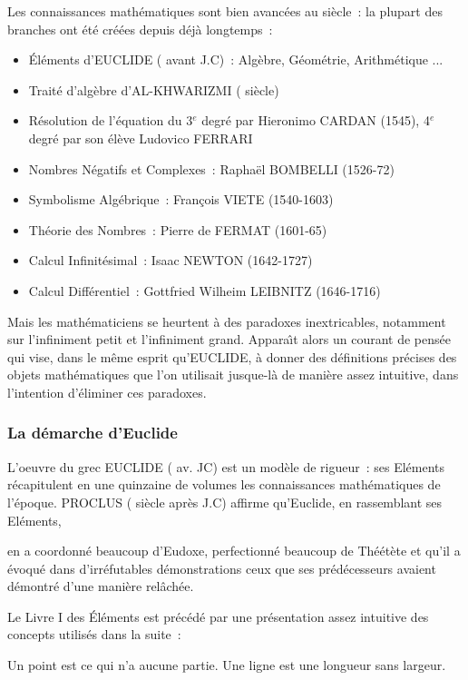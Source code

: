 Les connaissances mathématiques sont bien avancées au  siècle~: la
plupart des branches ont été créées depuis déjà longtemps~:

\begin{itemize}
\item Éléments d'EUCLIDE ( avant J.C)~: Algèbre, Géométrie,
  Arithmétique ...
\item Traité d'algèbre d'AL-KHWARIZMI ( siècle)
\item Résolution de l'équation du 3$^e$ degré par Hieronimo CARDAN
(1545), 4$^e$ degré par son élève Ludovico FERRARI
\item Nombres Négatifs et Complexes~: Rapha\"{e}l BOMBELLI (1526-72)
\item Symbolisme Algébrique~:  Fran\c{c}ois VIETE (1540-1603)
\item Théorie des Nombres~: Pierre de FERMAT (1601-65)
\item Calcul Infinitésimal~: Isaac NEWTON (1642-1727) 
\item Calcul Différentiel~: Gottfried Wilheim LEIBNITZ (1646-1716)
\end{itemize}

Mais les mathématiciens se heurtent à des paradoxes inextricables,
notamment sur l'infiniment petit et l'infiniment grand. Appara\^{\i}t
alors un courant de pensée qui vise, dans le m\^eme esprit qu'EUCLIDE,
à donner des définitions précises des objets mathématiques que l'on
utilisait jusque-là de manière assez intuitive, dans l'intention
d'éliminer ces paradoxes.

\subsubsection*{La démarche d'Euclide}

L'oeuvre du grec EUCLIDE ( av. JC) est un modèle de
rigueur~: ses Eléments récapitulent en une quinzaine de volumes les
connaissances mathématiques de l'époque. PROCLUS ( siècle après J.C)
affirme qu'Euclide, en rassemblant ses Eléments, 
\begin{citation}
en a coordonné
beaucoup d'Eudoxe, perfectionné beaucoup de Théétète et qu'il a évoqué
dans d'irréfutables démonstrations ceux que ses prédécesseurs avaient
démontré d'une manière rel\^achée.
\end{citation}

Le Livre I des Éléments est précédé par une présentation assez
intuitive des concepts utilisés dans la suite~:
\begin{citation}
Un point est ce qui n'a aucune partie. Une ligne est une longueur sans largeur.
\end{citation}

